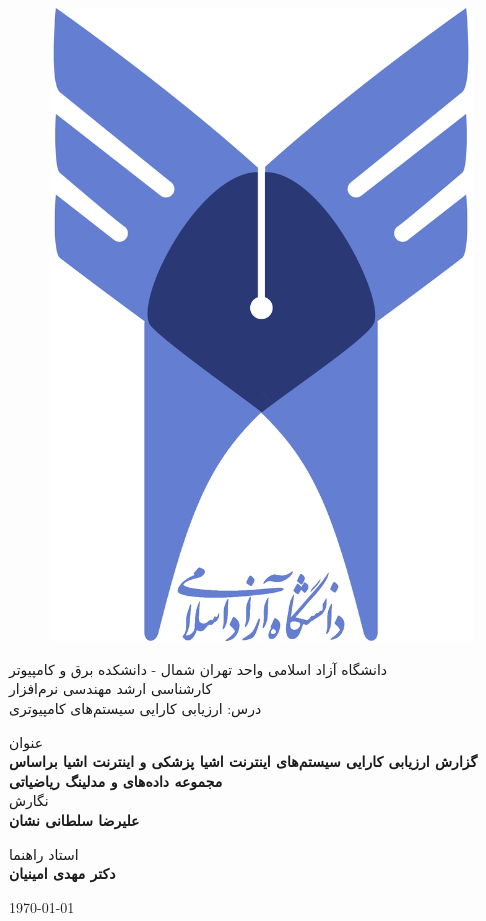 \begin{titlepage}

\begin{figure}
  \centering
  \includegraphics[scale=0.2]{figures/iau_logo.png}
\end{figure}

\center
\textsc{دانشگاه آزاد اسلامی واحد تهران شمال - دانشکده برق و کامپیوتر} \\
\textsc{کارشناسی ارشد مهندسی نرم‌افزار} \\
\textsc{درس: ارزیابی کارایی سیستم‌های کامپیوتری}

\vspace{1in}

\textsc{\large عنوان} \\
\textbf{\large گزارش ارزیابی کارایی سیستم‌های اینترنت اشیا پزشکی و اینترنت اشیا
براساس مجموعه داده‌های  و مدلینگ ریاضیاتی} \\

\vspace{0.5in}
\textsc{نگارش} \\
\textbf{\large علیرضا سلطانی نشان}

\vspace{0.3in}
\textsc{استاد راهنما} \\
\textbf{\large دکتر مهدی امینیان}

\vspace{0.5in}
\today

\end{titlepage}
